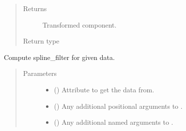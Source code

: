 \documentclass[letterpaper,10pt,english]{sphinxmanual}
\begin{document}
\begin{fulllineitems}
\begin{fulllineitems}
\begin{quote}
\begin{description}
\begin{itemize}
\end{itemize}

\item[{Returns}] \leavevmode
{} \textendash{} Transformed component.

\item[{Return type}] \leavevmode
{\hyperref[\detokenize{api/base_classes:geology.src.base_spatial.SpatialComponent}]{}}

\end{description}\end{quote}

\end{fulllineitems}


\begin{fulllineitems}
\label{\detokenize{api/base_classes:geology.src.base_spatial.SpatialComponent.spline_filter}}
Compute spline\_filter for given data.
\begin{quote}\begin{description}
\item[{Parameters}] \leavevmode\begin{itemize}
\item {} 
 (\sphinxstyleliteralemphasis{\sphinxupquote{, }}) \textendash{} Attribute to get the data from.

\item {} 
 () \textendash{} Any additional positional arguments to .

\item {} 
 () \textendash{} Any additional named arguments to .

\end{itemize}


\end{description}
\end{quote}
\end{fulllineitems}
\end{fulllineitems}
\end{document}
